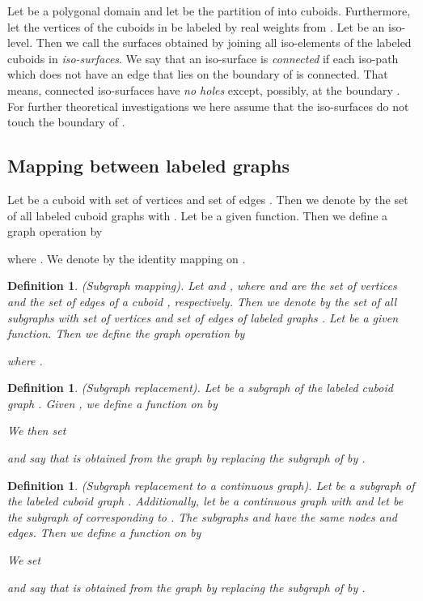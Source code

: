 \documentclass[a4paper,11pt]{article}
\newtheorem{definition}[theorem]{Definition}
\begin{document}
Let  be a
polygonal domain and let  be the partition of  into cuboids.
Furthermore, let the vertices of the cuboids in  be labeled by real weights from .
Let  be an iso-level. Then we call the surfaces obtained by joining all iso-elements
of the labeled cuboids in  {\it iso-surfaces}. We say that an iso-surface is {\it connected}
if each iso-path which does not have an edge that lies on the boundary of  is connected. That
means, connected iso-surfaces have {\it no holes} except, possibly, at the boundary .
For further theoretical investigations we here assume that the iso-surfaces do not touch the boundary
of .

\subsection{Mapping between labeled graphs}
Let  be a cuboid with set of vertices  and set of edges . Then we denote by 
the set of all labeled cuboid graphs  with .
Let  be a given function. Then we define a graph operation
 by

where . We denote by  the identity
mapping on .

\begin{definition}(Subgraph mapping). Let  and , where  and  are the set
of vertices and the set of edges of a cuboid , respectively. Then we denote by  the
set of all subgraphs with set of vertices  and set of edges  of labeled graphs
. Let  be a given function.
Then we define the graph operation  by

where .
\label{def:labeled-graph-2}
\end{definition}

\begin{definition}(Subgraph replacement). Let  be a subgraph of the labeled cuboid
graph . Given , we define a function 
on  by

We then set

and say that  is obtained from the graph  by replacing
the subgraph  of  by .
\label{def:labeled-graph-3}
\end{definition}

\begin{definition}(Subgraph replacement to a continuous graph). Let  be a subgraph
of the labeled cuboid graph . Additionally, let  be a continuous graph
with  and let  be the subgraph of 
corresponding to . The subgraphs  and  have the same nodes and edges. Then we define a function
 on  by

We set

and say that  is obtained from the graph  by replacing
the subgraph  of  by .
\label{def:labeled-graph-3-1}
\end{definition}
\end{document}
